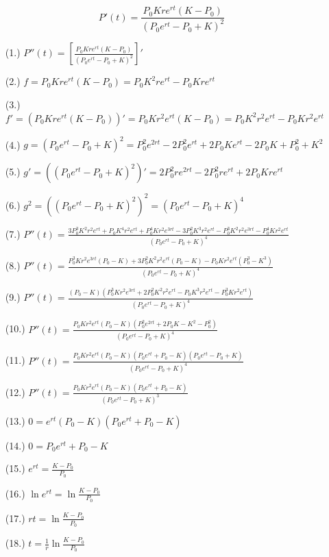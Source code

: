 \begin{equation*}
\boxed{P'(t) = \displaystyle\frac{P_0 K r e^{rt}(K-P_0)}{(P_0 e^{rt} - P_0 + K)^2}}
\end{equation*}

\begin{enumerate}
\item [(1.)] $P''(t) = \left[\displaystyle\frac{P_0 K r e^{rt}(K-P_0)}{(P_0 e^{rt} - P_0 + K)^2}\right]'$
\item [(2.)] $f = P_0 K r e^{rt}(K-P_0) = P_0 K^2 r e^{rt} - P_0 K r e^{rt}$
\item [(3.)] $f' = (P_0 K r e^{rt}(K-P_0))' = P_0 K r^2 e^{rt}(K-P_0) = P_0 K^2 r^2 e^{rt} - P_0 K r^2 e^{rt}$
\item [(4.)] $g = (P_0 e^{rt} - P_0 + K)^2 = P_0^2 e^{2rt} - 2P_0^2 e^{rt} + 2P_0 K e^{rt} - 2P_0 K + P_0^2 + K^2$
\item [(5.)] $g' = ((P_0 e^{rt} - P_0 + K)^2)' = 2P_0^2 r e^{2rt} - 2P_0^2 r e^{rt} + 2P_0 K r e^{rt}$
\item [(6.)] $g^2 = ((P_0 e^{rt} - P_0 + K)^2)^2 = (P_0 e^{rt} - P_0 + K)^4$
\item [(7.)] $P''(t) = \displaystyle\frac{3P_0^3 K^2 r^2 e^{rt} + P_0 K^4 r^2 e^{rt} + P_0^4 K r^2 e^{3rt} - 3P_0^2 K^3 r^2 e^{rt} - P_0^3 K^2 r^2 e^{3rt} - P_0^4 K r^2 e^{rt}}{(P_0e^{rt} - P_0 + K)^4}$
\item [(8.)] $P''(t) = \displaystyle\frac{P_0^3 K r^2 e^{3rt}(P_0-K) + 3P_0^2 K^2 r^2 e^{rt}(P_0-K) - P_0 K r^2 e^{rt}(P_0^3 - K^3)}{(P_0e^{rt} - P_0 + K)^4}$
\item [(9.)] $P''(t) = \displaystyle\frac{(P_0-K)(P_0^3 K r^2 e^{3rt} + 2P_0^2 K^2 r^2 e^{rt} - P_0 K^3 r^2 e^{rt} - P_0^3 K r^2 e^{rt})}{(P_0e^{rt} - P_0 + K)^4}$
\item [(10.)] $P''(t) = \displaystyle\frac{P_0 K r^2 e^{rt}(P_0-K)(P_0^2 e^{2rt} + 2P_0 K - K^2 - P_0^2)}{(P_0e^{rt} - P_0 + K)^4}$
\item [(11.)] $P''(t) = \displaystyle\frac{P_0 K r^2 e^{rt}(P_0-K)(P_0 e^{rt} + P_0 - K)(P_0 e^{rt} - P_0 + K)}{(P_0e^{rt} - P_0 + K)^4}$
\item [(12.)] $P''(t) = \displaystyle\frac{P_0 K r^2 e^{rt}(P_0-K)(P_0 e^{rt} + P_0 - K)}{(P_0 e^{rt} - P_0 + K)^3}$
\item [(13.)] $0 = e^{rt}(P_0-K)(P_0 e^{rt} + P_0 - K)$
\item [(14.)] $0 = P_0 e^{rt} + P_0 - K$
\item [(15.)] $e^{rt} = \displaystyle\frac{K-P_0}{P_0}$
\item [(16.)] $\ln e^{rt} = \ln \displaystyle\frac{K-P_0}{P_0}$
\item [(17.)] $rt = \ln \displaystyle\frac{K-P_0}{P_0}$
\item [(18.)] $t = \displaystyle\frac{1}{r} \ln \frac{K-P_0}{P_0} $
\end{enumerate}

